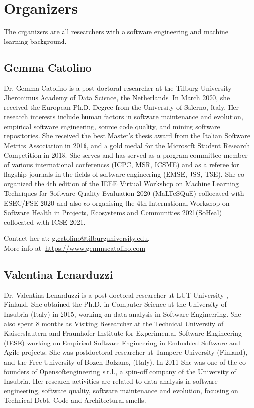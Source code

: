 
\section{Organizers}

The organizers are all researchers with a software engineering and machine learning background.

\label{sec:organizers}
\subsection{Gemma Catolino}
Dr. Gemma Catolino is a post-doctoral researcher at the Tilburg University $-$ Jheronimus Academy of Data Science, the Netherlands.
In March 2020, she received the European Ph.D. Degree from the University of Salerno, Italy. Her research interests include human factors in software maintenance and evolution, empirical software engineering, source code quality, and mining software repositories.
She received the best Master's thesis award from the Italian Software Metrics Association in 2016, and a gold medal for the Microsoft Student Research Competition in 2018. She serves and has served as a program committee member of various international conferences (ICPC, MSR, ICSME) and as a referee for flagship journals in the fields of software engineering (EMSE, JSS, TSE). She co-organized the 4th edition of the IEEE Virtual Workshop on Machine Learning Techniques for Software Quality Evaluation 2020 (MaLTeSQuE) collocated with ESEC/FSE 2020 and also co-organising the 4th International Workshop on Software Health in Projects, Ecosystems and Communities 2021(SoHeal) collocated with ICSE 2021.

\medskip
\noindent Contact her at: \href{mailto:g.catolino@tilburguniversity.edu}{g.catolino@tilburguniversity.edu}.\\
More info at: \url{https://www.gemmacatolino.com}


\subsection{Valentina Lenarduzzi}
Dr. Valentina Lenarduzzi is a post-doctoral researcher at LUT University , Finland. 
She obtained the Ph.D. in Computer Science at the University of Insubria (Italy) in 2015, working on data analysis in Software Engineering. She also spent 8 months as Visiting Researcher at the Technical University of Kaiserslautern and Fraunhofer Institute for Experimental Software Engineering (IESE) working on Empirical Software Engineering in Embedded Software and Agile projects.
She was postdoctoral researcher at Tampere University (Finland), and the Free University of Bozen-Bolzano, (Italy). In 2011 She was one of the co-founders of Opensoftengineering s.r.l., a spin-off company of the University of Insubria.
Her research activities are related to data analysis in software engineering, software quality, software maintenance and evolution, focusing on Technical Debt, Code and Architectural smells. 

